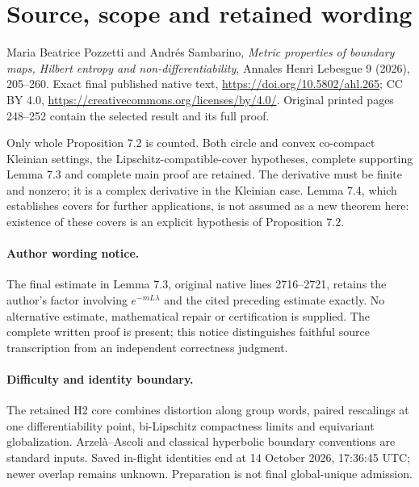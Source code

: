 \section*{Source, scope and retained wording}
Maria Beatrice Pozzetti and Andr\'es Sambarino, \emph{Metric properties of boundary maps, Hilbert entropy and non-differentiability}, Annales Henri Lebesgue 9 (2026), 205--260. Exact final published native text, \url{https://doi.org/10.5802/ahl.265}; CC BY 4.0, \url{https://creativecommons.org/licenses/by/4.0/}. Original printed pages 248--252 contain the selected result and its full proof.

Only whole Proposition 7.2 is counted. Both circle and convex co-compact Kleinian settings, the Lipschitz-compatible-cover hypotheses, complete supporting Lemma 7.3 and complete main proof are retained. The derivative must be finite and nonzero; it is a complex derivative in the Kleinian case. Lemma 7.4, which establishes covers for further applications, is not assumed as a new theorem here: existence of these covers is an explicit hypothesis of Proposition 7.2.

\paragraph{Author wording notice.} The final estimate in Lemma 7.3, original native lines 2716--2721, retains the author's factor involving $e^{-mL\lambda}$ and the cited preceding estimate exactly. No alternative estimate, mathematical repair or certification is supplied. The complete written proof is present; this notice distinguishes faithful source transcription from an independent correctness judgment.

\paragraph{Difficulty and identity boundary.} The retained H2 core combines distortion along group words, paired rescalings at one differentiability point, bi-Lipschitz compactness limits and equivariant globalization. Arzel\`a--Ascoli and classical hyperbolic boundary conventions are standard inputs. Saved in-flight identities end at 14 October 2026, 17:36:45 UTC; newer overlap remains unknown. Preparation is not final global-unique admission.
